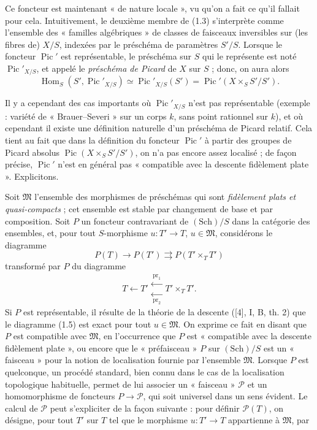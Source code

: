 Ce foncteur est maintenant « de nature locale », vu qu'on a fait ce qu'il
fallait pour cela. Intuitivement, le deuxième membre de (1.3) s'interprète
comme l'ensemble des « familles algébriques » de classes de faisceaux
inversibles sur (les fibres de) $X/S$, indexées par le préschéma de paramètres
$S'/S$. Lorsque le foncteur $\operatorname{Pic}'$ est représentable, le
préschéma sur $S$ qui le représente est noté $\operatorname{Pic}'_{X/S}$, et
appelé le \emph{préschéma de Picard} de $X$ sur $S$ ; donc, on aura alors
\begin{equation}
\operatorname{Hom}_S(S',\operatorname{Pic}'_{X/S})
\simeq\operatorname{Pic}'_{X/S}(S')
=\operatorname{Pic}'(X\times_S S'/S').
\tag{1.4}
\end{equation}

Il y a cependant des cas importants où $\operatorname{Pic}'_{X/S}$ n'est pas
représentable (exemple : variété de « Brauer--Severi » sur un corps $k$, sans
point rationnel sur $k$), et où cependant il existe une définition naturelle
d'un préschéma de Picard relatif. Cela tient au fait que dans la définition du
foncteur $\operatorname{Pic}'$ à partir des groupes de Picard absolus
$\operatorname{Pic}(X\times_S S'/S')$, on n'a pas encore assez localisé ; de
façon précise, $\operatorname{Pic}'$ n'est en général pas « compatible avec la
descente fidèlement plate ». Explicitons.

Soit $\mathfrak M$ l'ensemble des morphismes de préschémas qui sont
\emph{fidèlement plats et quasi-compacts} ; cet ensemble est stable par
changement de base et par composition. Soit $P$ un foncteur contravariant de
$(\mathrm{Sch})/S$ dans la catégorie des ensembles, et, pour tout
$S$-morphisme $u:T'\longrightarrow T$, $u\in\mathfrak M$, considérons le
diagramme
\begin{equation}
P(T)\longrightarrow P(T')\rightrightarrows P(T'\times_TT')
\tag{1.5}
\end{equation}
transformé par $P$ du diagramme
\[
T\longleftarrow T'\mathrel{\substack{\xleftarrow{\,\mathrm{pr}_1\,}\\[-0.35ex]
\xleftarrow[\,\mathrm{pr}_2\,]{}}}T'\times_TT'.
\]
Si $P$ est représentable, il résulte de la théorie de la descente ([4], I, B,
th. 2) que le diagramme (1.5) est exact pour tout $u\in\mathfrak M$. On exprime
ce fait en disant que $P$ est compatible avec $\mathfrak M$, en l'occurrence
que $P$ est « compatible avec la descente fidèlement plate », ou encore que le
« préfaisceau » $P$ sur $(\mathrm{Sch})/S$ est un « faisceau » pour la notion
de localisation fournie par l'ensemble $\mathfrak M$. Lorsque $P$ est
quelconque, un procédé standard, bien connu dans le cas de la localisation
topologique habituelle, permet de lui associer un « faisceau » $\mathcal P$ et
un homomorphisme de foncteurs $P\longrightarrow\mathcal P$, qui soit universel
dans un sens évident. Le calcul de $\mathcal P$ peut s'expliciter de la façon
suivante : pour définir $\mathcal P(T)$, on désigne, pour tout $T'$ sur $T$ tel
que le morphisme $u:T'\longrightarrow T$ appartienne à $\mathfrak M$, par

